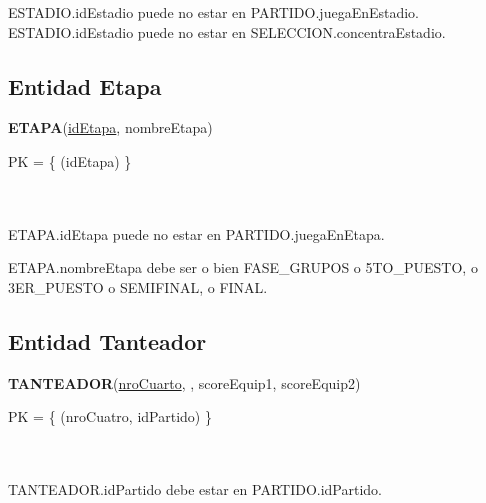 \documentclass[11pt, a4paper, spanish]{article}
\begin{document}
{{{

ESTADIO.idEstadio puede no estar en PARTIDO.juegaEnEstadio. \\
ESTADIO.idEstadio puede no estar en SELECCION.concentraEstadio. \\



\subsection{Entidad Etapa}

\textbf{ETAPA}(\underline{idEtapa}, nombreEtapa)

PK = \{ (idEtapa) \} \\
 \\
 \\


ETAPA.idEtapa puede no estar en PARTIDO.juegaEnEtapa. \\


ETAPA.nombreEtapa debe ser o bien FASE\_GRUPOS o 5TO\_PUESTO, o 3ER\_PUESTO o SEMIFINAL, o FINAL. 

\subsection{Entidad Tanteador}
\textbf{TANTEADOR}(\underline{nroCuarto}, \underline{}, scoreEquip1, scoreEquip2)

PK = \{ (nroCuatro, idPartido) \} \\
 \\
 \\


TANTEADOR.idPartido debe estar en PARTIDO.idPartido. \\

}}}
\end{document}
